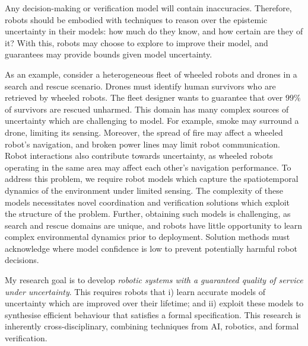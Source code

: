 \documentclass[11pt]{article}
\begin{document}

Any decision-making or verification model will contain inaccuracies.
%
Therefore, robots should be embodied with techniques to reason over the epistemic uncertainty in their models: how much do they know, and how certain are they of it?
%
With this, robots may choose to explore to improve their model, and guarantees may provide bounds given model uncertainty.

\fi

As an example, consider a heterogeneous fleet of wheeled robots and drones in a search and rescue scenario.
%
Drones must identify human survivors who are retrieved by wheeled robots.
%
The fleet designer wants to guarantee that over $99\%$ of survivors are rescued unharmed.
%
This domain has many complex sources of uncertainty which are challenging to model.
%
For example, smoke may surround a drone, limiting its sensing.
%
Moreover, the spread of fire may affect a wheeled robot's navigation, and broken power lines may limit robot communication. 
%
Robot interactions also contribute towards uncertainty, as wheeled robots operating in the same area may affect each other's navigation performance.
%
To address this problem, we require robot models which capture the spatiotemporal dynamics of the environment under limited sensing.
%
The complexity of these models necessitates novel coordination and verification solutions which exploit the structure of the problem.
%
Further, obtaining such models is challenging, as search and rescue domains are unique, and robots have little opportunity to learn complex environmental dynamics prior to deployment.
%
Solution methods must acknowledge where model confidence is low to prevent potentially harmful robot decisions.


My research goal is to develop \emph{robotic systems with a guaranteed quality of service under uncertainty}.
%
This requires robots that i) learn accurate models of uncertainty which are improved over their lifetime; and ii) exploit these models to synthesise efficient behaviour that satisfies a formal specification.
%
This research is inherently cross-disciplinary, combining techniques from AI, robotics, and formal verification.
\end{document}
